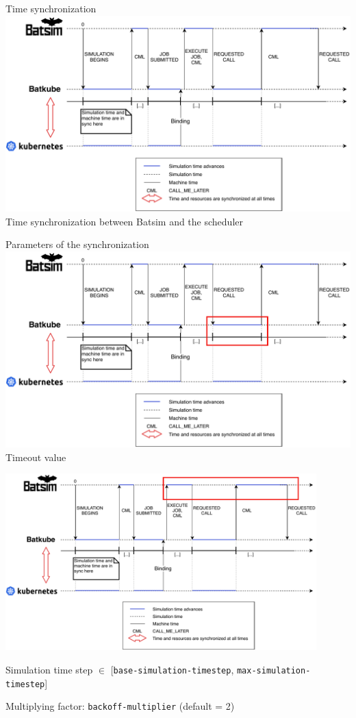 \documentclass[12pt, aspectratio=43]{beamer}
\begin{document}
\begin{frame}{Time synchronization}
	\centering
	\includegraphics[width=\textwidth]{../imgs/lignes_de_temps_simple.pdf}\\
	\small{Time synchronization between Batsim and the scheduler}
\end{frame}

\begin{frame}[allowframebreaks]{Parameters of the synchronization}
		\centering
		\includegraphics[width=\textwidth]{../imgs/timeout.pdf}\\
		Timeout value

		\includegraphics[width=0.9\textwidth]{../imgs/max-timestep.pdf}\\
		\raggedright
		\small
		Simulation time step $\in$ [\texttt{base-simulation-timestep}, \texttt{max-simulation-timestep}]

		Multiplying factor: \texttt{backoff-multiplier} (default = 2)
\end{frame}
\end{document}
